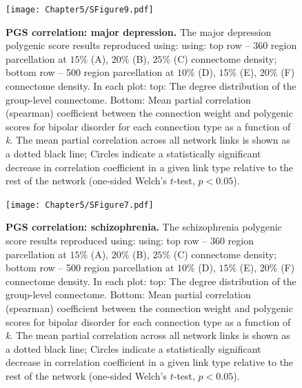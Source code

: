 \begin{figure}[h!]
\begin{center}
\texttt{[image: Chapter5/SFigure9.pdf]}%
\end{center}
\caption{\textbf{PGS correlation: major depression.} 
The major depression polygenic score results reproduced using: using: top row --  360 region parcellation at $15\%$ (A), $20\%$ (B), $25\%$ (C) connectome density; bottom row -- 500 region parcellation at $10\%$ (D), $15\%$ (E), $20\%$ (F) connectome density. In each plot: top: The degree distribution of the group-level connectome. Bottom: Mean partial correlation (spearman) coefficient between the connection weight and polygenic scores for bipolar disorder for each connection type as a function of \textit{k}. The mean partial correlation across all network links is shown as a dotted black line; Circles indicate a statistically significant decrease in correlation coefficient in a given link type relative to the rest of the network (one-sided Welch's $t$-test, $p < 0.05$).}
\label{fig:Ch5SFig9}
\end{figure}
 
\begin{figure}[h!]
\begin{center}
\texttt{[image: Chapter5/SFigure7.pdf]}%
\end{center}
\caption{\textbf{PGS correlation: schizophrenia.} 
The schizophrenia polygenic score results reproduced using: using: top row -- 360 region parcellation at $15\%$ (A), $20\%$ (B), $25\%$ (C) connectome density; bottom row -- 500 region parcellation at $10\%$ (D), $15\%$ (E), $20\%$ (F) connectome density. In each plot: top: The degree distribution of the group-level connectome. Bottom: Mean partial correlation (spearman) coefficient between the connection weight and polygenic scores for bipolar disorder for each connection type as a function of \textit{k}. The mean partial correlation across all network links is shown as a dotted black line; Circles indicate a statistically significant decrease in correlation coefficient in a given link type relative to the rest of the network (one-sided Welch's $t$-test, $p < 0.05$).}
\label{fig:Ch5SFig7}
\end{figure}

